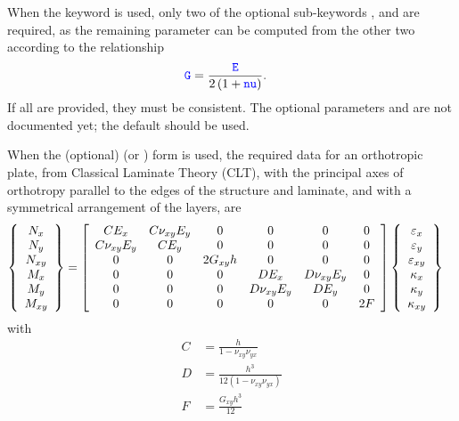 When the  keyword is used, only two of the optional
sub-keywords ,  and  are required, as the remaining
parameter can be computed from the other two according to the relationship
\begin{align}
	\nt{G}
	&=
	\frac{\nt{E}}{2\plbr{1 + \nt{nu}}}
	.
\end{align}
If all are provided, they must be consistent.
The optional parameters  and  are not documented yet;
the default should be used.

When the (optional)  (or ) form is used,
the required data for an orthotropic plate, from Classical Laminate Theory (CLT),
with the principal axes of orthotropy parallel to the edges of the structure and laminate,
and with a symmetrical arrangement of the layers, are
\begin{align}
        \cubr{\cvvect{
                N_{x}
                \\
                N_{y}
                \\
                N_{xy}
                \\
                M_{x}
                \\
                M_{y}
                \\
                M_{xy}
        }}
        &=
        \sqbr{\matr{cccccc}{
	 CE_{x} & C\nu_{xy}E_y & 0 & 0 & 0 & 0 
	 \\
	 C\nu_{xy}E_y & CE_{y} & 0 & 0 & 0 & 0 
	 \\
	 0 & 0 & 2G_{xy}h & 0 & 0 & 0 
	 \\
	 0 & 0 & 0 & DE_{x} & D\nu_{xy}E_y & 0
	 \\
	 0 & 0 & 0 & D\nu_{xy}E_y & DE_{y} & 0 
	 \\
	 0 & 0 & 0 & 0 & 0 & 2F 
	        }}
        \cubr{\cvvect{
                \varepsilon_{x}
                \\
                \varepsilon_{y}
                \\
                \varepsilon_{xy}
                \\
                \kappa_{x}
		\\
                \kappa_{y}
		\\
                \kappa_{xy}
        }}
\end{align}
with
\begin{subequations}
\begin{align}
	C &= \frac{h}{1-\nu_{xy}\nu_{yx}}
	\\
	D &= \frac{h^3}{12(1-\nu_{xy}\nu_{yx})}
	\\
	F &= \frac{G_{xy}h^3}{12} 
\end{align}
\end{subequations}
